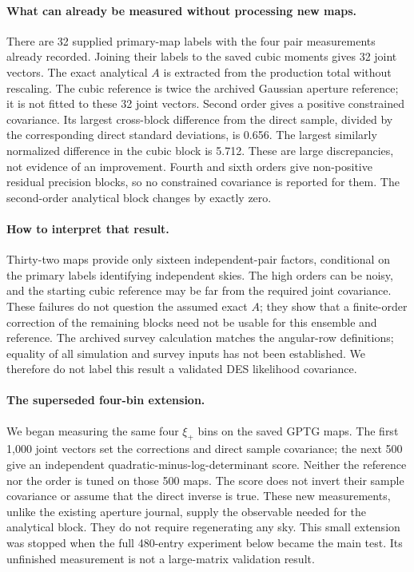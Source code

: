 \paragraph{What can already be measured without processing new maps.}
There are 32 supplied primary-map labels with the four pair measurements
already recorded. Joining their labels to the saved cubic moments gives
32 joint vectors. The exact analytical $A$ is extracted from the production
total without rescaling. The cubic reference is twice the archived
Gaussian aperture reference; it is not fitted to these 32 joint vectors.
Second order gives a positive constrained covariance. Its largest cross-block
difference from the direct sample, divided by the corresponding direct
standard deviations, is 0.656. The largest similarly normalized difference
in the cubic block is 5.712. These are large discrepancies, not evidence of
an improvement. Fourth and sixth orders give non-positive residual precision
blocks, so no constrained covariance is reported for them. The second-order
analytical block changes by exactly zero.

\paragraph{How to interpret that result.}
Thirty-two maps provide only sixteen independent-pair factors, conditional
on the primary labels identifying independent skies. The high orders can
be noisy, and the starting cubic reference may be far from the required
joint covariance. These failures do not question the assumed exact $A$;
they show that a finite-order correction of the remaining blocks need not
be usable for this ensemble and reference. The archived survey calculation
matches the angular-row definitions; equality of all simulation and survey
inputs has not been established. We therefore do not label this result a
validated DES likelihood covariance.

\paragraph{The superseded four-bin extension.}
We began measuring the same four $\xi_+$ bins on the saved GPTG maps. The
first 1,000 joint vectors set the corrections and direct sample covariance;
the next 500 give an independent quadratic-minus-log-determinant score.
Neither the reference nor the order is tuned on those 500 maps. The score
does not invert their sample covariance or assume that the direct inverse
is true. These new measurements, unlike the existing aperture journal,
supply the observable needed for the analytical block. They do not require
regenerating any sky. This small extension was stopped when the full 480-entry experiment below
became the main test. Its unfinished measurement is not a large-matrix
validation result.

